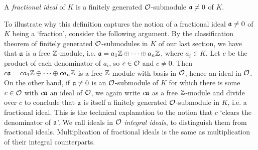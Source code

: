 \begin{definition}
	A \emph{fractional ideal} of $K$ is a finitely generated $\mathcal{O}$-submodule $\mathfrak{a}\neq 0$ of $K$.
\end{definition}

To illustrate why this definition captures the notion of a fractional ideal $\mathfrak{a}\neq 0$ of $K$ being a `fraction', consider the following argument. By the classification theorem of finitely generated $\mathcal{O}$-submodules in $K$ of our last section, we have that $\mathfrak{a}$ is a free $\mathbb{Z}$-module, i.e. $\mathfrak{a}=a_1\mathbb{Z}\oplus\cdots\oplus a_n\mathbb{Z}$, where $a_i\in K$. Let $c$ be the product of each denominator of $a_i$, so $c\in\mathcal{O}$ and $c\neq 0$. Then $c\mathfrak{a} = ca_1\mathbb{Z}\oplus\cdots\oplus ca_n\mathbb{Z}$ is a free $\mathbb{Z}$-module with basis in $\mathcal{O}$, hence an ideal in $\mathcal{O}$. On the other hand, if $\mathfrak{a}\neq 0$ is an $\mathcal{O}$-submodule of $K$ for which there is some $c\in\mathcal{O}$ with $c\mathfrak{a}$ an ideal of $\mathcal{O}$, we again write $c\mathfrak{a}$ as a free $\mathbb{Z}$-module and divide over $c$ to conclude that $\mathfrak{a}$ is itself a finitely generated $\mathcal{O}$-submodule in $K$, i.e. a fractional ideal. This is the technical explanation to the notion that $c$ `clears the denominator of $\mathfrak{a}$'. We call ideals in $\mathcal{O}$ \emph{integral ideals}, to distinguish them from fractional ideals. Multiplication of fractional ideals is the same as multiplication of their integral counterparts.


